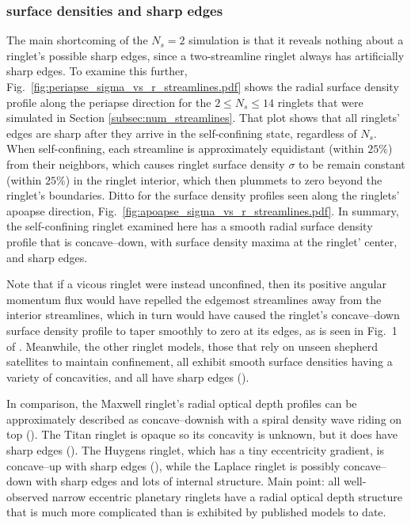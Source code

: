 \documentclass[preprint]{aastex62}
\begin{document}
\subsubsection{surface densities and sharp edges}
\label{subsubsec:sharp_edges}

The main shortcoming of the $N_s=2$ simulation is that it reveals nothing about a ringlet's
possible sharp edges, since a two-streamline ringlet always has artificially sharp edges.
To examine this further, Fig.\ \ref{fig:periapse_sigma_vs_r_streamlines.pdf} shows the radial 
surface density profile along the periapse direction for the $2\le N_s\le14$ ringlets 
that were simulated in Section \ref{subsec:num_streamlines}. That plot shows that all ringlets'
edges are sharp after they arrive in the self-confining state, regardless of $N_s$. When self-confining,
each streamline is approximately equidistant (within $25\%$) from their neighbors, which causes
ringlet surface density $\sigma$ to be remain constant (within $25\%$) in the ringlet interior, 
which then plummets to zero beyond the ringlet's boundaries. Ditto for the surface density
profiles seen along the ringlets' apoapse direction, Fig.\ \ref{fig:apoapse_sigma_vs_r_streamlines.pdf}.
In summary, the self-confining ringlet examined here has a smooth radial surface density profile that is
concave--down, with surface density maxima at the ringlet' center, and sharp edges.

Note that if a vicous ringlet were instead unconfined, then its positive angular momentum flux
would have repelled the edgemost streamlines away from the interior streamlines, 
which in turn would have caused the ringlet's concave--down surface density profile
to taper smoothly to zero at its edges, as is seen in Fig.\ 1 of \cite{P81}.
Meanwhile, the other ringlet models, those that rely on unseen shepherd satellites to maintain confinement, all
exhibit smooth surface densities having a variety of concavities, and all have sharp edges (\citealt{GT79, CG00, ME02}).

In comparison, the Maxwell ringlet's radial optical depth profiles can be approximately 
described as concave--downish with a spiral density wave riding on top (\citealt{Netal14}). The Titan
ringlet is opaque so its concavity is unknown, but it does have sharp edges (\citealt{Netal14}).
The Huygens ringlet, which has a tiny eccentricity gradient, is concave--up with sharp edges 
(\citealt{Fetal16}), while the Laplace ringlet is possibly concave--down with sharp edges
and lots of internal structure. Main point: all well-observed narrow eccentric planetary ringlets
have a radial optical depth structure that is much more complicated than is exhibited by
published models to date.
\end{document}
